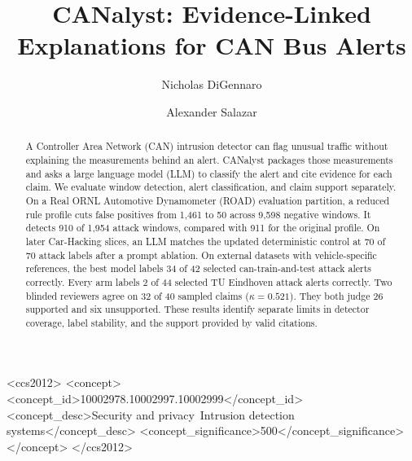 \documentclass[sigconf,pbalance=true]{acmart}
\begin{document}
\title{CANalyst: Evidence-Linked Explanations for CAN Bus Alerts}

\author{Nicholas DiGennaro}

\author{Alexander Salazar}

\renewcommand{\shortauthors}{DiGennaro and Salazar}

\begin{abstract}
A Controller Area Network (CAN) intrusion detector can flag unusual traffic without explaining the measurements behind an alert. CANalyst packages those measurements and asks a large language model (LLM) to classify the alert and cite evidence for each claim. We evaluate window detection, alert classification, and claim support separately. On a Real ORNL Automotive Dynamometer (ROAD) evaluation partition, a reduced rule profile cuts false positives from 1,461 to 50 across 9,598 negative windows. It detects 910 of 1,954 attack windows, compared with 911 for the original profile. On later Car-Hacking slices, an LLM matches the updated deterministic control at 70 of 70 attack labels after a prompt ablation. On external datasets with vehicle-specific references, the best model labels 34 of 42 selected can-train-and-test attack alerts correctly. Every arm labels 2 of 44 selected TU Eindhoven attack alerts correctly. Two blinded reviewers agree on 32 of 40 sampled claims ($\kappa=0.521$). They both judge 26 supported and six unsupported. These results identify separate limits in detector coverage, label stability, and the support provided by valid citations.
\end{abstract}

\begin{CCSXML}
<ccs2012>
  <concept>
    <concept_id>10002978.10002997.10002999</concept_id>
    <concept_desc>Security and privacy~Intrusion detection systems</concept_desc>
    <concept_significance>500</concept_significance>
  </concept>
</ccs2012>
\end{CCSXML}

\maketitle
\end{document}
